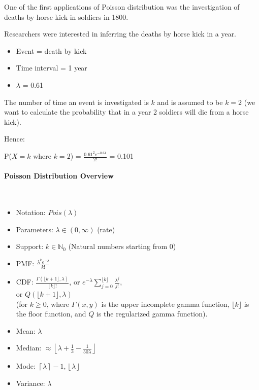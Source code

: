 \documentclass{article}
\begin{document}
One of the first applications of Poisson distribution was the investigation of deaths by horse kick in soldiers in 1800. 

Researchers were interested in inferring the deaths by horse kick in a year.
\begin{itemize}
    \item Event = death by kick
    \item Time interval = 1 year
    \item $\lambda$ = 0.61
\end{itemize}

The number of time an event is investigated is $k$ and is assumed to be $k = 2$ (we want to calculate the probability that in a year 2 soldiers will die from a horse kick).

Hence: 

P($X = k$ where $k = 2$) = $ \displaystyle \frac {0.61^{2}e^{-0.61 }}{2!} $ = 0.101 

\paragraph{Poisson Distribution Overview}\mbox{} \\

\begin{itemize}
    \item Notation: $Pois(\lambda)$
    \item Parameters: $ \displaystyle \lambda \in (0,\infty)$ (rate)
    \item Support: $ \displaystyle k\in \mathbb {N} _{0}$ (Natural numbers starting from 0) 
    \item PMF: $ \displaystyle {\frac {\lambda ^{k}e^{-\lambda }}{k!}} $
    \item CDF: $ \displaystyle {\frac {\Gamma (\lfloor k+1\rfloor ,\lambda )}{\lfloor k\rfloor !}}$, or $\displaystyle e^{-\lambda }\sum _{j=0}^{\lfloor k\rfloor }{\frac {\lambda ^{j}}{j!}}$, \\ or $\displaystyle Q(\lfloor k+1\rfloor ,\lambda )$ \\ (for $\displaystyle k\geq 0$, where $\Gamma (x,y)$ is the upper incomplete gamma function, $ \displaystyle \lfloor k\rfloor $ is the floor function, and $Q$ is the regularized gamma function).
    \item Mean: $\lambda$
    \item Median: $ \displaystyle \approx \left\lfloor \lambda +{\frac {1}{3}}-{\frac {1}{50\lambda }}\right\rfloor $
    \item Mode: $ \displaystyle \left\lceil \lambda \right\rceil -1,\left\lfloor \lambda \right\rfloor $
    \item Variance: $ \lambda $ 
\end{itemize}
\end{document}
